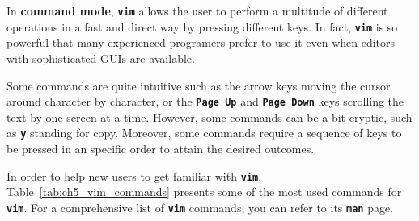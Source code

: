 In \textbf{command mode}, \textbf{\texttt{vim}} allows the user to perform a multitude of different operations in a fast and direct way by pressing different keys. In fact, \textbf{\texttt{vim}} is so powerful that many experienced programers prefer to use it even when editors with sophisticated \acs{GUI}s are available.

Some commands are quite intuitive such as the arrow keys moving the cursor around character by character, or the \textbf{\texttt{Page Up}} and \textbf{\texttt{Page Down}} keys scrolling the text by one screen at a time. However, some commands can be a bit cryptic, such as \textbf{\texttt{y}} standing for copy. Moreover, some commands require a sequence of keys to be pressed in an specific order to attain the desired outcomes.

In order to help new users to get familiar with \textbf{\texttt{vim}}, Table~\ref{tab:ch5_vim_commands} presents some of the most used commands for \textbf{\texttt{vim}}. For a comprehensive list of \textbf{\texttt{vim}} commands, you can refer to its \textbf{\texttt{man}} page.

